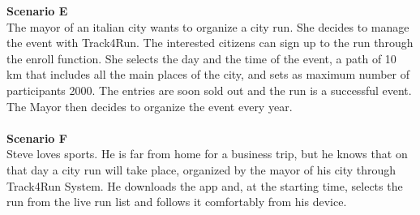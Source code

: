 \textbf{Scenario E} \\  
    The mayor of an italian city wants to organize a city run. She decides to manage the event with Track4Run. The interested citizens can sign up to the run through the enroll function. She selects the day and the time of the event, a path of 10 km that includes all the main places of the city, and sets as maximum number of participants 2000. The entries are soon sold out and the run is a successful event. The Mayor then decides to organize the event every year. \\ \\
\textbf{Scenario F} \\ 
    Steve loves sports. He is far from home for a business trip, but he knows that on that day a city run will take place, organized by the mayor of his city through Track4Run System. He downloads the app and, at the starting time, selects the run from the live run list and follows it comfortably from his device. 


